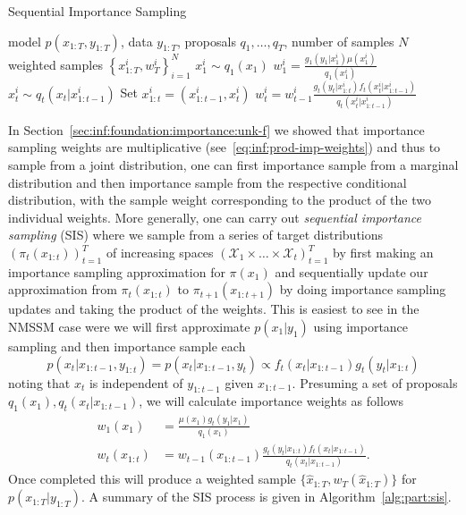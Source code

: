 \begin{algorithm}[tb]
	\caption{Sequential Importance Sampling}
	\label{alg:part:sis}
	\begin{spacing}{1.2}
		\begin{algorithmic}[1]
			\renewcommand{\algorithmicrequire}{\textbf{Inputs:}}
			\renewcommand{\algorithmicensure}{\textbf{Outputs:}}			 
			\Require model $p(x_{1:T},y_{1:T})$, data $y_{1:T}$, proposals $q_1,\dots,q_T$, number of samples $N$
			\Ensure weighted samples $\left\{x_{1:T}^i,w_T^i\right\}_{i=1}^N$
			\State $x_1^i \sim q_1(x_1)$
			\State $w_1^i = \frac{g_1(y_1|x_1^i) \mu(x_1^i)}{q_1(x_1^i)}$
			\State $x_t^i \sim q_t(x_t | x_{1:t-1}^i)$ 
			\State Set $x_{1:t}^i = (x_{1:t-1}^{i},x_t^i)$
			\State $w_t^i = w_{t-1}^i \frac{g_t(y_t|x_{1:t}^i) f_t(x_t^i | x_{1:t-1}^{i})}{q_t(x_t^i|x_{1:t-1}^{i})}$
			\EndFor
			\EndFor
		\end{algorithmic}
	\end{spacing}
\end{algorithm}


In Section~\ref{sec:inf:foundation:importance:unk-f} we showed that importance sampling weights
are multiplicative (see~\eqref{eq:inf:prod-imp-weights}) and thus to sample from a joint
distribution, one can first importance sample from a marginal distribution and then importance
sample from the respective conditional distribution, with the sample weight corresponding to the
product of the two individual weights.  More generally, one can carry out \emph{sequential importance
	sampling} (SIS) where we sample from a series of target distributions $(\pi_t(x_{1:t}))_{t = 1}^T$ of 
increasing spaces $(\mathcal{X}_1 \times \dots \times \mathcal{X}_t)_{t = 1}^T$ by first making
an importance sampling approximation for $\pi(x_1)$ and sequentially update our approximation from
$\pi_t(x_{1:t})$ to $\pi_{t+1}(x_{1:t+1})$ by doing importance sampling updates and taking the product of
the weights.  This is easiest to see in the NMSSM case were we will first approximate $p(x_1 | y_1)$
using importance sampling and then importance sample each 
\[
p (x_t | x_{1:t-1}, y_{1:t})=p(x_t | x_{1:t-1}, y_t)\propto f_{t}(x_t | x_{1:t-1}) g_{t}(y_t | x_{1:t})
\]
noting that $x_t$ is independent of $y_{1:t-1}$ given $x_{1:t-1}$.  Presuming a set of proposals 
$q_1(x_1), q_t(x_t | x_{1:t-1})$, we will calculate importance weights as follows
\begin{subequations}
	\label{eq:part:sis-weights}
\begin{align}
w_1 (x_1) &= \frac{\mu (x_1)g_{t}(y_1 | x_1)}{q_1(x_1)} \\
w_t (x_{1:t}) &= w_{t-1} (x_{1:t-1}) \frac{g_{t}(y_t|x_{1:t}) f_{t}(x_t | x_{1:t-1})}{q_t(x_t|x_{1:t-1})}.
\end{align}
\end{subequations}
Once completed this will produce a weighted sample $\{\hat{x}_{1:T},w_T(\hat{x}_{1:T})\}$ for 
$p(x_{1:T} | y_{1:T})$.  A summary of the SIS process is given in Algorithm~\ref{alg:part:sis}.

